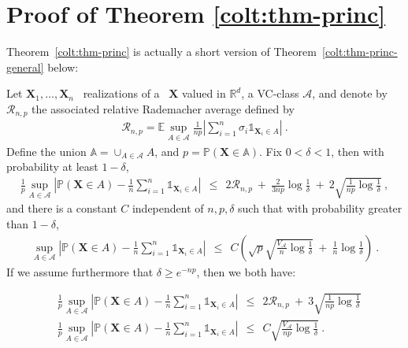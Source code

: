 







\section{Proof of Theorem \ref{colt:thm-princ}}

Theorem~\ref{colt:thm-princ} is actually  a short version of
Theorem~\ref{colt:thm-princ-general} below:
\begin{theorem}
\label{colt:thm-princ-general}
Let $\mathbf{X}_1,\ldots,\mathbf{X}_n$ \iid~realizations of a \rv~$\mathbf{X}$ valued in $\mathbb{R}^d$, a VC-class $\mathcal{A}$, and denote by $\mathcal{R}_{n,p}$ the associated relative Rademacher average defined by 
\begin{align}
\label{colt:def-extr-rad}
\mathcal{R}_{n,p} = \mathbb{E} \sup_{A \in \mathcal{A}} \frac{1}{np} \left | \sum_{i=1}^{n} \sigma_i \mathds{1}_{\mathbf{X}_i \in A}\right|~. 
\end{align}
Define the union $\mathbb{A} = \cup_{A \in \mathcal{A}} A$, and $ p = \mathbb{P}(\mathbf{X} \in \mathbb{A})$. Fix $0<\delta<1$, then with probability at least $1-\delta$,
\begin{align*}
\frac{1}{p} \sup_{A \in \mathcal{A}} \left | \mathbb{P}(\mathbf{X} \in A) - \frac{1}{n} \sum_{i=1}^n \mathds{1}_{\mathbf{X}_i \in A} \right| ~~\le~~ 2 \mathcal{R}_{n,p} ~+~ \frac{2}{3np} \log \frac{1}{\delta} ~+~ 2 \sqrt{\frac{1}{np} \log \frac{1}{\delta}}~,
\end{align*}
and there is a constant $C$ independent of $n,p,\delta$ such that with probability greater than $1- \delta$,
\begin{align*}
\sup_{A \in \mathcal{A}} \left | \mathbb{P}(\mathbf{X} \in A) - \frac{1}{n} \sum_{i=1}^n \mathds{1}_{\mathbf{X}_i \in A} \right| ~~\le~~ C \left( \sqrt{p} \sqrt{\frac{V_{\mathcal{A}}}{n} \log{\frac{1}{\delta}}} ~+~ \frac{1}{n} \log \frac{1}{\delta} \right)~.
\end{align*}
\noindent
If we assume furthermore that $\delta \ge e^{-np}$, then we both have:

\begin{align*}
&\frac{1}{p} \sup_{A \in \mathcal{A}} \left | \mathbb{P}(\mathbf{X} \in A) - \frac{1}{n} \sum_{i=1}^n \mathds{1}_{\mathbf{X}_i \in A} \right| ~~\le~~ 2 \mathcal{R}_{n,p}  ~+~ 3 \sqrt{\frac{1}{np} \log \frac{1}{\delta}}\\
&\frac{1}{p} \sup_{A \in \mathcal{A}} \left | \mathbb{P}(\mathbf{X} \in A) - \frac{1}{n} \sum_{i=1}^n \mathds{1}_{\mathbf{X}_i \in A} \right| ~~\le~~ C \sqrt{\frac{V_{\mathcal{A}}}{np} \log{\frac{1}{\delta}}}~.
\end{align*}
\end{theorem}


